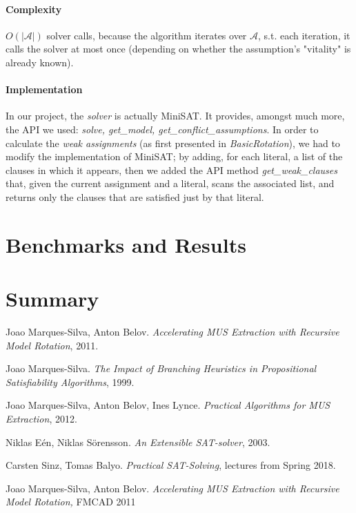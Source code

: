 \documentclass[]{article}
\begin{document}
	\paragraph{Complexity} $ O(|\mathcal{A}|) $ solver calls, because the algorithm iterates over $ \mathcal{A} $, s.t. each iteration, it calls the solver at most once (depending on whether the assumption's "vitality" is already known).

	\paragraph{Implementation} In our project, the \textit{solver} is actually MiniSAT. It provides, amongst much more, the API we used: \textit{solve, get\_model, get\_conflict\_assumptions}. In order to calculate the \textit{weak assignments} (as first presented in \textit{BasicRotation}), we had to modify the implementation of MiniSAT; by adding, for each literal, a list of the clauses in which it appears, then we added the API method \textit{get\_weak\_clauses} that, given the current assignment and a literal, scans the associated list, and returns only the clauses that are satisfied just by that literal.

	
	\section{Benchmarks and Results}
	
	\section{Summary}
	
	\pagebreak
	\begin{thebibliography}{9}
		
			Joao Marques-Silva,
			Anton Belov.
			\textit{Accelerating MUS Extraction with Recursive Model Rotation},
			2011.
			
			Joao Marques-Silva.
			\textit{The Impact of Branching Heuristics in Propositional Satisfiability Algorithms},
			1999.
			
			Joao Marques-Silva,
			 Anton Belov,
			 Ines Lynce.
			\textit{Practical Algorithms for MUS Extraction},
			2012.
			
			Niklas Eén,
			Niklas Sörensson.
			\textit{An Extensible SAT-solver},
			2003.
			
		    Carsten Sinz,
		    Tomas Balyo.
		    \textit{Practical SAT-Solving}, lectures from Spring 2018.
		    
			Joao Marques-Silva,
			Anton Belov.
			\textit{Accelerating MUS Extraction with Recursive Model Rotation,}
			FMCAD 2011
			
		
		
	\end{thebibliography}
\end{document}

